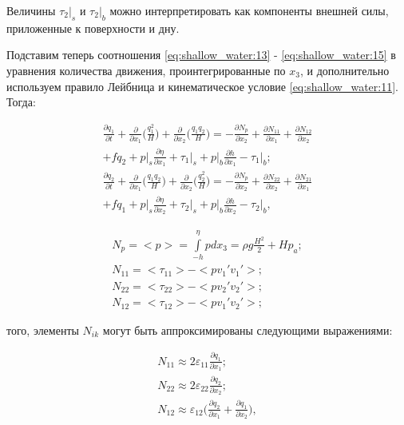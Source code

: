 \documentclass[14pt]{extreport}
\begin{document}
Величины $\tau_2|_s$ и $\tau_2|_b$ можно интерпретировать как компоненты внешней силы, приложенные к поверхности и дну.

Подставим теперь соотношения \ref{eq:shallow_water:13} - \ref{eq:shallow_water:15} в уравнения количества движения, проинтегрированные по $x_3$, и дополнительно используем правило Лейбница\cite{bib:calc:zorich} и кинематическое условие \ref{eq:shallow_water:11}. Тогда:

\begin{equation}\label{eq:shallow_water:17}
\begin{aligned}
\frac{\partial q_1}{\partial t} + \frac{\partial}{\partial x_1} \bigg(\frac{q_1^2}{H}\bigg)+\frac{\partial }{\partial x_2}\bigg(\frac{q_1 q_2}{H}\bigg) = -\frac{\partial N_p}{\partial x_2} + \frac{\partial N_{11}}{\partial x_1} + \frac{\partial N_{12}}{\partial x_2} \\+ fq_2 + p\bigg|_s \frac{\partial \eta}{\partial x_1} + \tau_1\bigg|_s+p\bigg|_b\frac{\partial h}{\partial x_1} - \tau_1\bigg|_b; \\
\frac{\partial q_2}{\partial t} + \frac{\partial}{\partial x_1} \bigg(\frac{q_1 q_2}{H}\bigg)+\frac{\partial }{\partial x_2}\bigg(\frac{q_2^2}{H}\bigg) = -\frac{\partial N_p}{\partial x_2} + \frac{\partial N_{22}}{\partial x_2} + \frac{\partial N_{21}}{\partial x_1} \\+ fq_1 + p\bigg|_s \frac{\partial \eta}{\partial x_2} + \tau_2\bigg|_s+p\bigg|_b\frac{\partial h}{\partial x_2} - \tau_2\bigg|_b,
\end{aligned}
\end{equation}


\begin{equation}\label{eq:shallow_water:18}
\begin{aligned}
N_p = <p> = \int\limits^\eta_{-h} pdx_3=\rho g \frac{H^2}{2} + Hp_a; \\
N_{11} = <\tau_{11}>-<pv_1'v_1'>; \\
N_{22} = <\tau_{22}>-<pv_2'v_2'>; \\
N_{12} = <\tau_{12}>-<pv_1'v_2'>;
\end{aligned}
\end{equation}

 того, элементы $N_{ik}$ могут быть аппроксимированы следующими выражениями:

\begin{equation}\label{eq:shallow_water:19}
\begin{aligned}
N_{11} \approx 2 \varepsilon_{11}\frac{\partial q_1}{\partial x_1}; \\
N_{22} \approx 2 \varepsilon_{22}\frac{\partial q_2}{\partial x_2}; \\
N_{12} \approx \varepsilon_{12}\bigg(\frac{\partial q_2}{\partial x_1}+\frac{\partial q_1}{\partial x_2}\bigg),
\end{aligned}
\end{equation}
\end{document}
